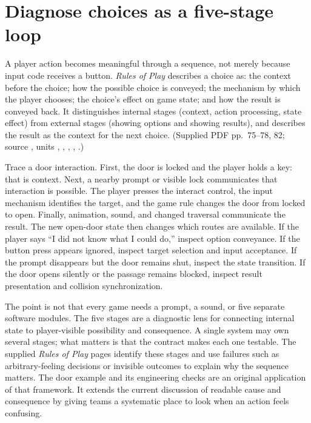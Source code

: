 \section{Diagnose choices as a five-stage loop}\label{06-engine-ii-ch047-diagnose-choices-as-a-five-stage-loop}

\hypertarget{06-engine-ii-ch047-diagnose-choices-as-a-five-stage-loop}{}

A player action becomes meaningful through a sequence, not merely because input code receives a button. \emph{Rules of Play} describes a choice as: the context before the choice; how the possible choice is conveyed; the mechanism by which the player chooses; the choice's effect on game state; and how the result is conveyed back. It distinguishes internal stages (context, action processing, state effect) from external stages (showing options and showing results), and describes the result as the context for the next choice. (Supplied PDF pp.~75--78, 82; source , units , , , , .)

Trace a door interaction. First, the door is locked and the player holds a key: that is context. Next, a nearby prompt or visible lock communicates that interaction is possible. The player presses the interact control, the input mechanism identifies the target, and the game rule changes the door from locked to open. Finally, animation, sound, and changed traversal communicate the result. The new open-door state then changes which routes are available. If the player says ``I did not know what I could do,'' inspect option conveyance. If the button press appears ignored, inspect target selection and input acceptance. If the prompt disappears but the door remains shut, inspect the state transition. If the door opens silently or the passage remains blocked, inspect result presentation and collision synchronization.

The point is not that every game needs a prompt, a sound, or five separate software modules. The five stages are a diagnostic lens for connecting internal state to player-visible possibility and consequence. A single system may own several stages; what matters is that the contract makes each one testable. The supplied \emph{Rules of Play} pages identify these stages and use failures such as arbitrary-feeling decisions or invisible outcomes to explain why the sequence matters. The door example and its engineering checks are an original application of that framework. It extends the current discussion of readable cause and consequence by giving teams a systematic place to look when an action feels confusing.

